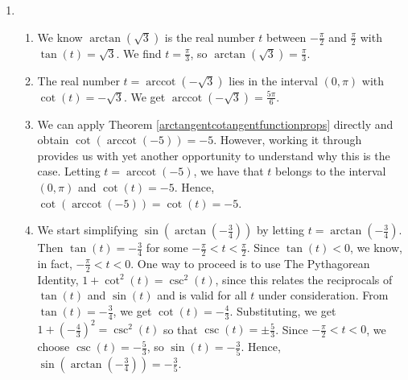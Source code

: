{
\begin{enumerate}

\item

\begin{enumerate}

\item  We know $\arctan(\sqrt{3})$ is the real number $t$ between $-\frac{\pi}{2}$ and $\frac{\pi}{2}$ with $\tan(t) = \sqrt{3}$.  We find $t = \frac{\pi}{3}$, so $\arctan(\sqrt{3}) = \frac{\pi}{3}$.

\item The real number $t = \operatorname{arccot}(-\sqrt{3})$ lies in the interval $(0,\pi)$ with $\cot(t) = -\sqrt{3}$.  We get $\operatorname{arccot}(-\sqrt{3}) = \frac{5\pi}{6}$.

\item  We can apply Theorem \ref{arctangentcotangentfunctionprops} directly and obtain $\cot(\operatorname{arccot}(-5)) = -5$.  However, working it through provides us with yet another opportunity to understand why this is the case. Letting $t = \operatorname{arccot}(-5)$, we have that $t$ belongs to the interval $(0,\pi)$ and $\cot(t)=-5$.  Hence, $\cot(\operatorname{arccot}(-5)) = \cot(t)=-5$.

\item   We start simplifying  $\sin\left(\arctan\left(-\frac{3}{4}\right)\right)$ by letting $t = \arctan\left(-\frac{3}{4}\right)$.  Then $\tan(t) = -\frac{3}{4}$ for some $-\frac{\pi}{2} < t < \frac{\pi}{2}$.  Since $\tan(t) < 0$, we know, in fact, $-\frac{\pi}{2} < t < 0$.  One way to proceed is to use The Pythagorean Identity, $1 + \cot^{2}(t) = \csc^{2}(t)$, since this relates the reciprocals of $\tan(t)$ and $\sin(t)$ and is valid for all $t$ under consideration.   From  $\tan(t) = -\frac{3}{4}$, we get $\cot(t) = -\frac{4}{3}$.  Substituting, we get $1 + \left(-\frac{4}{3}\right)^2 = \csc^{2}(t)$ so that $\csc(t) = \pm \frac{5}{3}$.  Since $-\frac{\pi}{2} < t < 0$, we choose $\csc(t) = -\frac{5}{3}$, so $\sin(t) = -\frac{3}{5}$. Hence, $\sin\left(\arctan\left(-\frac{3}{4}\right)\right) = -\frac{3}{5}$.

\end{enumerate}

\enlargethispage{2\baselineskip}



\end{enumerate}}
